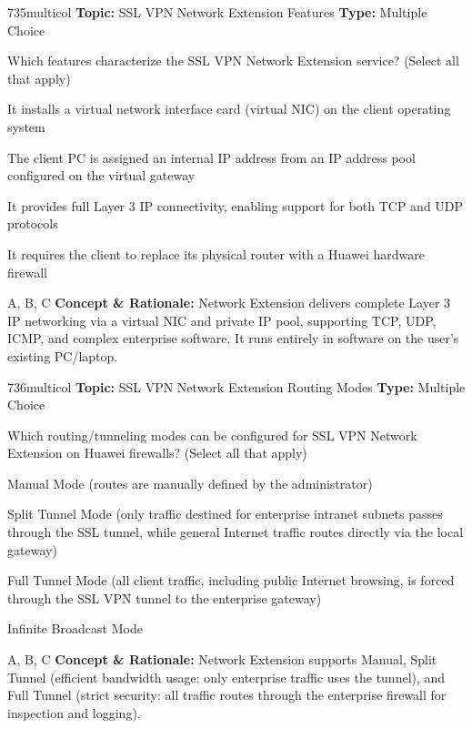 \begin{qcard}{735}{multicol}
\textcolor{darkslate!75}{\small\textbf{Topic:} SSL VPN Network Extension Features \hfill \textbf{Type:} Multiple Choice}\vspace{0.4em}\par
Which features characterize the SSL VPN Network Extension service? (Select all that apply)
\begin{qoptions}
\item It installs a virtual network interface card (virtual NIC) on the client operating system
\item The client PC is assigned an internal IP address from an IP address pool configured on the virtual gateway
\item It provides full Layer 3 IP connectivity, enabling support for both TCP and UDP protocols
\item It requires the client to replace its physical router with a Huawei hardware firewall
\end{qoptions}
\end{qcard}
\nopagebreak
\begin{explainbox}{A, B, C}
\textbf{Concept \& Rationale:} Network Extension delivers complete Layer 3 IP networking via a virtual NIC and private IP pool, supporting TCP, UDP, ICMP, and complex enterprise software. It runs entirely in software on the user's existing PC/laptop.
\end{explainbox}

\begin{qcard}{736}{multicol}
\textcolor{darkslate!75}{\small\textbf{Topic:} SSL VPN Network Extension Routing Modes \hfill \textbf{Type:} Multiple Choice}\vspace{0.4em}\par
Which routing/tunneling modes can be configured for SSL VPN Network Extension on Huawei firewalls? (Select all that apply)
\begin{qoptions}
\item Manual Mode (routes are manually defined by the administrator)
\item Split Tunnel Mode (only traffic destined for enterprise intranet subnets passes through the SSL tunnel, while general Internet traffic routes directly via the local gateway)
\item Full Tunnel Mode (all client traffic, including public Internet browsing, is forced through the SSL VPN tunnel to the enterprise gateway)
\item Infinite Broadcast Mode
\end{qoptions}
\end{qcard}
\nopagebreak
\begin{explainbox}{A, B, C}
\textbf{Concept \& Rationale:} Network Extension supports Manual, Split Tunnel (efficient bandwidth usage: only enterprise traffic uses the tunnel), and Full Tunnel (strict security: all traffic routes through the enterprise firewall for inspection and logging).
\end{explainbox}

